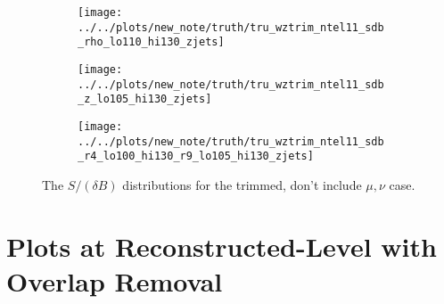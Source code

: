 \begin{figure}[!htbp]\captionsetup{justification=centering}
\begin{center}
\begin{subfigure}[t]{18pc}\centering\texttt{[image: ../../plots/new\_note/truth/tru\_wztrim\_ntel11\_sdb\_rho\_lo110\_hi130\_zjets]}\caption{}\end{subfigure}
\begin{subfigure}[t]{18pc}\centering\texttt{[image: ../../plots/new\_note/truth/tru\_wztrim\_ntel11\_sdb\_z\_lo105\_hi130\_zjets]}\caption{}\end{subfigure}
\begin{subfigure}[t]{18pc}\centering\texttt{[image: ../../plots/new\_note/truth/tru\_wztrim\_ntel11\_sdb\_r4\_lo100\_hi130\_r9\_lo105\_hi130\_zjets]}\caption{}\end{subfigure}
\caption{\label{fig:mbbwztrim}The $S/(\delta B)$ distributions for the trimmed, don't include $\mu,\nu$ case.}
\end{center}
\end{figure}
\clearpage
\section{Plots at Reconstructed-Level with Overlap Removal}

